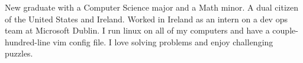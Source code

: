 

\begin{cvparagraph}

New graduate with a Computer Science major and a Math minor. A dual citizen of the United States and Ireland. Worked in Ireland as an intern on a dev ops team at Microsoft Dublin. I run linux on all of my computers and have a couple-hundred-line vim config file. I love solving problems and enjoy challenging puzzles.
\end{cvparagraph}
